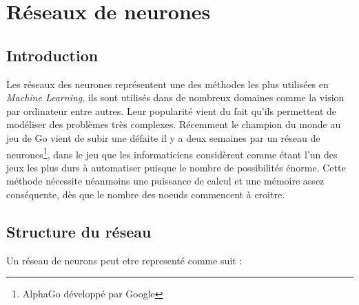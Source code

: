 \section{Réseaux de neurones}

\subsection{Introduction}

Les réseaux des neurones représentent une des méthodes les plus utilisées en \textit{Machine Learning}, ils sont utilisés dans de nombreux domaines comme la vision par ordinateur entre autres. Leur popularité vient du fait qu'ils permettent de modéliser des problèmes très complexes. Récemment le champion du monde au jeu de Go vient de subir une défaite il y a deux semaines par un réseau de neurones\footnote{AlphaGo développé par Google}, dans le jeu que les informaticiens considèrent comme étant l'un des jeux les plus durs à automatiser puisque le nombre de possibilités énorme.
Cette méthode nécessite néanmoins une puissance de calcul et une mémoire assez conséquente, dès que le nombre des noeuds commencent à croitre.

\newpage

\subsection{Structure du réseau}

Un réseau de neurons peut etre representé comme suit :

\def\layersep{2.5cm}

